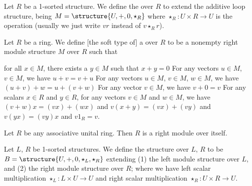 \begin{definition}
Let $R$ be a 1-sorted structure. We define the 
over $R$ to extend the additive loop structure, being $M=\structure{U,+,0,\star_{R}}$
where $\star_{R}\colon U\times R\to U$ is the 
operation (usually we just write $vr$ instead of $v\star_{R}r$).
\end{definition}

\begin{definition}
Let $R$ be a ring.
We define [the soft type of] a  over $R$
to be a nonempty right module structure $M$ over $R$ such that
\begin{itemize}
 for all $x\in M$, there exists a $y\in M$ such that $x+y=0$
 For any vectors
$u\in M$, $v\in M$, we have $u+v=v+u$
 For any vectors
$u\in M$, $v\in M$, $w\in M$, we have $(u+v)+w=u+(v+w)$
 For any vector $v\in M$,
we have $v+0=v$
 For any scalars $x\in R$
and $y\in R$, for any vectors $v\in M$ and $w\in M$, we have
$(v+w)x=(vx)+(wx)$ and $v(x+y)=(vx)+(vy)$ and $v(yx)=(vy)x$ and $v1_{R}=v$.
\end{itemize}
\end{definition}

\begin{example}
Let $R$ be any associative unital ring. 
Then $R$ is a right module over itself.
\end{example}

\begin{definition}
Let $L$, $R$ be 1-sorted structures.
We define the structure  over $L$, $R$ to
be $B=\structure{U,+,0,\star_{L},\star_{R}}$
extending (1) the left module structure over $L$, and (2) the right
module structure over $R$;
where
we have left scalar multiplication $\star_{L}\colon L\times U\to U$
and right scalar multiplication $\star_{R}\colon U\times R\to U$.
\end{definition}

